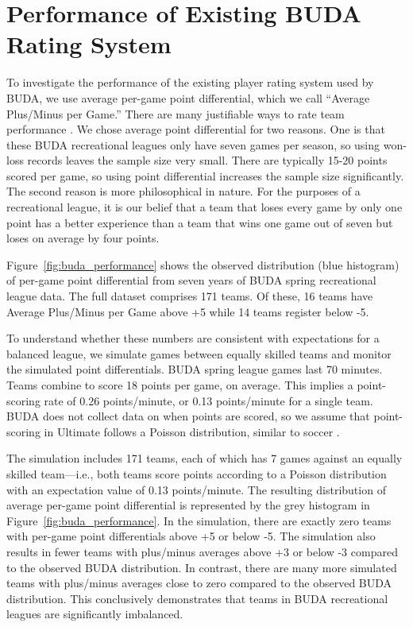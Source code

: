 \section{Performance of Existing BUDA Rating System}\label{sec:existing_performance}

To investigate the performance of the existing player rating system used by BUDA, we use average per-game point differential, which we call ``Average Plus/Minus per Game.'' There are many justifiable ways to rate team performance \cite{Langville_2012}.  We chose average point differential for two reasons.  One is that these BUDA recreational leagues only have seven games per season, so using won-loss records leaves the sample size very small.  There are typically 15-20 points scored per game, so using point differential increases the sample size significantly.  The second reason is more philosophical in nature.  For the purposes of a recreational league, it is our belief that a team that loses every game by only one point has a better experience than a team that wins one game out of seven but loses on average by four points.  

Figure~\ref{fig:buda_performance} shows the observed distribution (blue histogram) of per-game point differential from seven years of BUDA spring recreational league data.  The full dataset comprises 171 teams.  Of these, 16 teams have Average Plus/Minus per Game above +5 while 14 teams register below -5.  

To understand whether these numbers are consistent with expectations for a balanced league, we simulate games between equally skilled teams and monitor the simulated point differentials.  BUDA spring league games last 70 minutes.  Teams combine to score 18 points per game, on average. This implies a point-scoring rate of 0.26 points/minute, or 0.13 points/minute for a single team.  BUDA does not collect data on when points are scored, so we assume that point-scoring in Ultimate follows a Poisson distribution, similar to soccer \cite{Heuer_2010}.

The simulation includes 171 teams, each of which has 7 games against an equally skilled team---i.e., both teams score points according to a Poisson distribution with an expectation value of 0.13 points/minute. The resulting distribution of average per-game point differential is represented by the grey histogram in Figure~\ref{fig:buda_performance}.  In the simulation, there are exactly zero teams with per-game point differentials above +5 or below -5.  The simulation also results in fewer teams with plus/minus averages above +3 or below -3 compared to the observed BUDA distribution.  In contrast, there are many more simulated teams with plus/minus averages close to zero compared to the observed BUDA distribution.  This conclusively demonstrates that teams in BUDA recreational leagues are significantly imbalanced.

